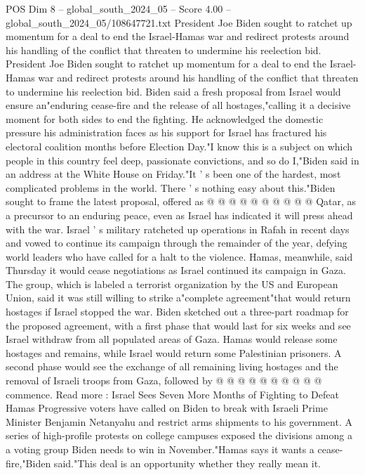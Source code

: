 \begin{textsample}{POS Dim 8 – global\_south\_2024\_05 – Score 4.00 – global\_south\_2024\_05/108647721.txt}  \label{ex:f8_pos_343}
President Joe Biden sought to ratchet up momentum for a deal to end the Israel-Hamas war and redirect protests around his handling of the conflict that threaten to undermine his reelection bid.
President Joe Biden sought to ratchet up momentum for a deal to end the Israel-Hamas war and redirect protests around his handling of the conflict that threaten to undermine his reelection bid.
Biden said a fresh proposal from Israel would ensure an"enduring cease-fire and the release of all hostages,"calling it a decisive moment for both sides to end the fighting.
He acknowledged the domestic pressure his administration faces as his support for Israel has fractured his electoral coalition months before Election Day."I know this is a subject on which people in this country feel deep, passionate convictions, and so do I,"Biden said in an address at the White House on Friday."It ' s been one of the hardest, most complicated problems in the world.
There ' s nothing easy about this."Biden sought to frame the latest proposal, offered as @ @ @ @ @ @ @ @ @ @ Qatar, as a precursor to an enduring peace, even as Israel has indicated it will press ahead with the war.
Israel ' s military ratcheted up operations in Rafah in recent days and vowed to continue its campaign through the remainder of the year, defying world leaders who have called for a halt to the violence.
Hamas, meanwhile, said Thursday it would cease negotiations as Israel continued its campaign in Gaza.
The group, which is labeled a terrorist organization by the US and European Union, said it was still willing to strike a"complete agreement"that would return hostages if Israel stopped the war.
Biden sketched out a three-part roadmap for the proposed agreement, with a first phase that would last for six weeks and see Israel withdraw from all populated areas of Gaza.
Hamas would release some hostages and remains, while Israel would return some Palestinian prisoners.
A second phase would see the exchange of all remaining living hostages and the removal of Israeli troops from Gaza, followed by @ @ @ @ @ @ @ @ @ @ commence.
Read more : Israel Sees Seven More Months of Fighting to Defeat Hamas Progressive voters have called on Biden to break with Israeli Prime Minister Benjamin Netanyahu and restrict arms shipments to his government.
A series of high-profile protests on college campuses exposed the divisions among a a voting group Biden needs to win in November."Hamas says it wants a cease-fire,"Biden said."This deal is an opportunity whether they really mean it.

\end{textsample}
